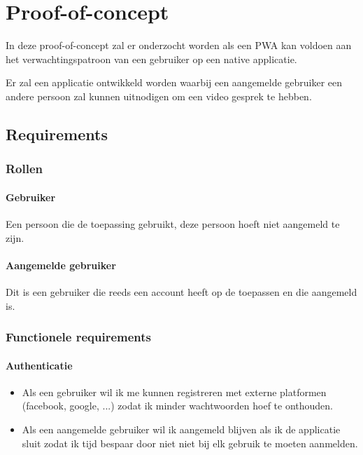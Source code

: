 \chapter{Proof-of-concept}
\label{ch:Proof-of-concept}

In deze proof-of-concept zal er onderzocht worden als een PWA kan voldoen aan het verwachtingspatroon van een gebruiker op een native applicatie.

Er zal een applicatie ontwikkeld worden waarbij een aangemelde gebruiker een  andere persoon zal kunnen uitnodigen om een video gesprek te hebben. 

 \section{Requirements}

	 \subsection{Rollen}
	 
	 \subsubsection{Gebruiker}
		Een persoon die de toepassing gebruikt, deze persoon hoeft niet aangemeld te zijn.
	 
	 \subsubsection{Aangemelde gebruiker}
	 	Dit is een gebruiker die reeds een account heeft op de toepassen en die aangemeld is.
	 
 \subsection{Functionele requirements}
 	\subsubsection{Authenticatie}
	 	\begin{itemize}
		 	\item Als een gebruiker wil ik me kunnen registreren met externe platformen (facebook, google, ...) zodat ik minder wachtwoorden hoef te onthouden.
		 	\item Als een aangemelde gebruiker wil ik aangemeld blijven als ik de applicatie sluit zodat ik tijd bespaar door niet niet bij elk gebruik te moeten aanmelden.
	 	\end{itemize}
	 	

